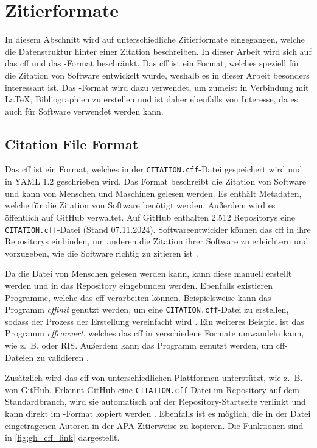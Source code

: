\section{Zitierformate}
\label{sec:zitierformate}
In diesem Abschnitt wird auf unterschiedliche Zitierformate eingegangen, welche die Datenstruktur hinter einer Zitation beschreiben.
In dieser Arbeit wird sich auf das \gls{cff} und das -Format beschränkt.
Das \gls{cff} ist ein Format, welches speziell für die Zitation von Software entwickelt wurde, weshalb es in dieser Arbeit besonders interessant ist.
Das -Format wird dazu verwendet, um zumeist in Verbindung mit \LaTeX{}, Bibliographien zu erstellen und ist daher ebenfalls von Interesse, da es auch für Software verwendet werden kann.

\subsection{Citation File Format}
\label{subsec:citation-file-format}
Das \gls{cff} ist ein Format, welches in der \texttt{CITATION.cff}-Datei gespeichert wird und in YAML 1.2 geschrieben wird. 
Das Format beschreibt die Zitation von Software und kann von Menschen und Maschinen gelesen werden.
Es enthält Metadaten, welche für die Zitation von Software benötigt werden.
Außerdem wird es öffentlich auf GitHub verwaltet.
Auf GitHub enthalten 2.512 Repositorys eine \texttt{CITATION.cff}-Datei (Stand 07.11.2024).
Softwareentwickler können das \gls{cff} in ihre Repositorys einbinden, um anderen die Zitation ihrer Software zu erleichtern und vorzugeben, wie die Software richtig zu zitieren ist \autocite{druskat_citation_2021}.

Da die Datei von Menschen gelesen werden kann, kann diese manuell erstellt werden und in das Repository eingebunden werden.
Ebenfalls existieren Programme, welche das \gls{cff} verarbeiten können.
Beispielsweise kann das Programm \emph{cffinit} genutzt werden, um eine \texttt{CITATION.cff}-Datei zu erstellen, sodass der Prozess der Erstellung vereinfacht wird \autocite{spaaks_cffinit_2023}.
Ein weiteres Beispiel ist das Programm \emph{cffconvert}, welches das \gls{cff} in verschiedene Formate umwandeln kann, wie z.~B.  oder RIS.
Außerdem kann das Programm genutzt werden, um \gls{cff}-Dateien zu validieren \autocite{spaaks_cffconvert_2021}.

Zusätzlich wird das \gls{cff} von unterschiedlichen Plattformen unterstützt, wie z.~B. von GitHub.
Erkennt GitHub eine \texttt{CITATION.cff}-Datei im Repository auf dem Standardbranch, wird sie automatisch auf der Repository-Startseite verlinkt und kann direkt im -Format kopiert werden \autocites{druskat_citation_2021}{github_about_2024-1}.
Ebenfalls ist es möglich, die in der Datei eingetragenen Autoren in der APA-Zitierweise zu kopieren.
Die Funktionen sind in \autoref{fig:gh_cff_link} dargestellt.

